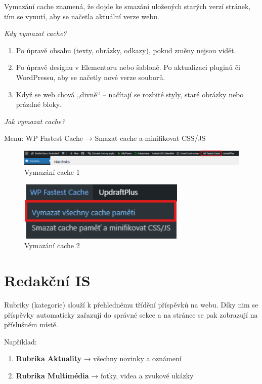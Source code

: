 \documentclass[12pt,a4paper]{article}
\begin{document}
	Vymazání cache znamená, že dojde ke smazání uložených starých verzí stránek, tím se vynutí, aby se načetla aktuální verze webu.
	
	\textit{Kdy vymazat cache?}
	\begin{enumerate}
	\item Po úpravě obsahu (texty, obrázky, odkazy), pokud změny nejsou vidět.
	
	\item Po úpravě designu v Elementoru nebo šabloně.
	Po aktualizaci pluginů či WordPressu, aby se načetly nové verze souborů.
	
	\item Když se web chová „divně“ – načítají se rozbité styly, staré obrázky nebo prázdné bloky.

	\end{enumerate}
	
	\textit{Jak vymazat cache?}
	
	Menu: WP Fastest Cache → Smazat cache a minifikovat CSS/JS
	
	\begin{figure}[htp]
		\centering
		\includegraphics[width=17cm]{WPdeletecache.png}
		\caption{Vymazání cache 1}
		\label{fig:role}
	\end{figure}
	
	
	\begin{figure}[htp]
		\centering
		\includegraphics[width=8cm]{WPdeletecache1.png}
		\caption{Vymazání cache 2}
		\label{fig:role}
	\end{figure}
	
	
	
	
	
	\newpage
	\section{Redakční IS}
	Rubriky (kategorie) slouží k přehlednému třídění příspěvků na webu. Díky nim se příspěvky automaticky zařazují do správné sekce a na stránce se pak zobrazují na příslušném místě. 
	
	Například:
	\begin{enumerate}
		\item \textbf{Rubrika Aktuality} → všechny novinky a oznámení
		\item \textbf{Rubrika Multimédia} → fotky, videa a zvukové ukázky
	\end{enumerate}
	
\end{document}
